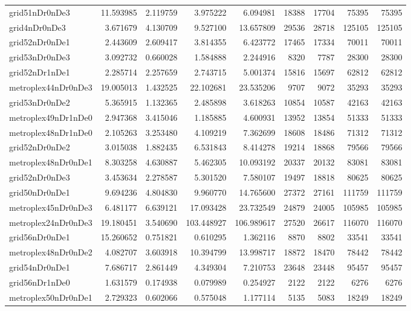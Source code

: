 \begin{longtable}{|l|r|r|r|r|r|r|r|r|}
grid51nDr0nDe3 & 11.593985 & 2.119759 & 3.975222 & 6.094981 & 18388 & 17704 & 75395 & 75395 \\
grid4nDr0nDe3 & 3.671679 & 4.130709 & 9.527100 & 13.657809 & 29536 & 28718 & 125105 & 125105 \\
grid52nDr0nDe1 & 2.443609 & 2.609417 & 3.814355 & 6.423772 & 17465 & 17334 & 70011 & 70011 \\
grid53nDr0nDe3 & 3.092732 & 0.660028 & 1.584888 & 2.244916 & 8320 & 7787 & 28300 & 28300 \\
grid52nDr1nDe1 & 2.285714 & 2.257659 & 2.743715 & 5.001374 & 15816 & 15697 & 62812 & 62812 \\
metroplex44nDr0nDe3 & 19.005013 & 1.432525 & 22.102681 & 23.535206 & 9707 & 9072 & 35293 & 35293 \\
grid53nDr0nDe2 & 5.365915 & 1.132365 & 2.485898 & 3.618263 & 10854 & 10587 & 42163 & 42163 \\
metroplex49nDr1nDe0 & 2.947368 & 3.415046 & 1.185885 & 4.600931 & 13952 & 13854 & 51333 & 51333 \\
metroplex48nDr1nDe0 & 2.105263 & 3.253480 & 4.109219 & 7.362699 & 18608 & 18486 & 71312 & 71312 \\
grid52nDr0nDe2 & 3.015038 & 1.882435 & 6.531843 & 8.414278 & 19214 & 18868 & 79566 & 79566 \\
metroplex48nDr0nDe1 & 8.303258 & 4.630887 & 5.462305 & 10.093192 & 20337 & 20132 & 83081 & 83081 \\
grid52nDr0nDe3 & 3.453634 & 2.278587 & 5.301520 & 7.580107 & 19497 & 18818 & 80625 & 80625 \\
grid50nDr0nDe1 & 9.694236 & 4.804830 & 9.960770 & 14.765600 & 27372 & 27161 & 111759 & 111759 \\
metroplex45nDr0nDe3 & 6.481177 & 6.639121 & 17.093428 & 23.732549 & 24879 & 24005 & 105985 & 105985 \\
metroplex24nDr0nDe3 & 19.180451 & 3.540690 & 103.448927 & 106.989617 & 27520 & 26617 & 116070 & 116070 \\
grid56nDr0nDe1 & 15.260652 & 0.751821 & 0.610295 & 1.362116 & 8870 & 8802 & 33541 & 33541 \\
metroplex48nDr0nDe2 & 4.082707 & 3.603918 & 10.394799 & 13.998717 & 18872 & 18470 & 78442 & 78442 \\
grid54nDr0nDe1 & 7.686717 & 2.861449 & 4.349304 & 7.210753 & 23648 & 23448 & 95457 & 95457 \\
grid56nDr1nDe0 & 1.631579 & 0.174938 & 0.079989 & 0.254927 & 2122 & 2122 & 6276 & 6276 \\
metroplex50nDr0nDe1 & 2.729323 & 0.602066 & 0.575048 & 1.177114 & 5135 & 5083 & 18249 & 18249 \\

\end{longtable}
